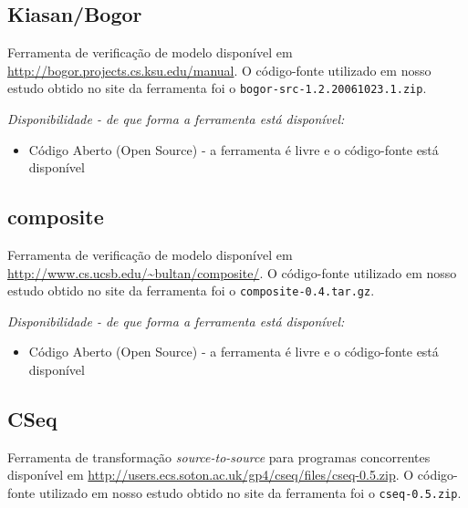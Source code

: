 \subsection{Kiasan/Bogor}

Ferramenta de verificação de modelo disponível em
\url{http://bogor.projects.cs.ksu.edu/manual}. O código-fonte utilizado em
nosso estudo obtido no site da ferramenta foi o
\texttt{bogor-src-1.2.20061023.1.zip}.

\begin{description}

  \item {\it Disponibilidade - de que forma a ferramenta está disponível:}
    \begin{itemize}
      \item Código Aberto (Open Source) - a ferramenta é livre e o código-fonte está disponível
    \end{itemize}

\end{description}

\subsection{composite}

Ferramenta de verificação de modelo disponível em
\url{http://www.cs.ucsb.edu/~bultan/composite/}. O código-fonte utilizado em
nosso estudo obtido no site da ferramenta foi o \texttt{composite-0.4.tar.gz}.

\begin{description}

  \item {\it Disponibilidade - de que forma a ferramenta está disponível:}
    \begin{itemize}
      \item Código Aberto (Open Source) - a ferramenta é livre e o código-fonte está disponível
    \end{itemize}

\end{description}

\subsection{CSeq}

Ferramenta de transformação {\it source-to-source} para programas
concorrentes disponível em
\url{http://users.ecs.soton.ac.uk/gp4/cseq/files/cseq-0.5.zip}. O código-fonte
utilizado em nosso estudo obtido no site da ferramenta foi o
\texttt{cseq-0.5.zip}.


